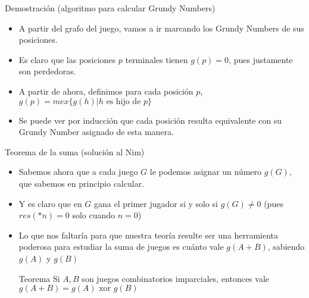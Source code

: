 \documentclass{beamer}
\begin{document}
\begin{frame}{Demostración (algoritmo para calcular Grundy Numbers)}
    \begin{itemize}
        \item A partir del grafo del juego, vamos a ir marcando los Grundy Numbers de sus posiciones.
        \item Es claro que las posiciones $p$ terminales tienen $g(p) = 0$, pues justamente son perdedoras.
        \item A partir de ahora, definimos para cada posición $p$, $g(p) = mex \{ g(h) | h \mbox{ es hijo de } p \}$
        \item Se puede ver por inducción que cada posición resulta equivalente con su Grundy Number asignado de esta manera.
    \end{itemize}
\end{frame}

\begin{frame}{Teorema de la suma (solución al Nim)}
    \begin{itemize}
        \item Sabemos ahora que a cada juego $G$ le podemos asignar un número $g(G)$, que sabemos en principio calcular.
        \item  Y es claro que en $G$ gana el primer jugador si y solo si $g(G) \neq 0$ (pues $res(*n) = 0$ solo cuando $n=0$)
        \item Lo que nos faltaría para que nuestra teoría resulte ser una herramienta poderosa para estudiar la suma de juegos
        es cuánto vale $g(A+B)$, sabiendo $g(A)$ y $g(B)$
        \begin{block}{Teorema}
          Si $A,B$ son juegos combinatorios imparciales, entonces vale $g(A+B) = g(A) \mbox{\ xor\ } g(B)$
        \end{block}
    \end{itemize}
\end{frame}
\end{document}
